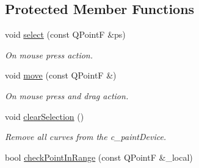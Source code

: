 \subsection*{Protected Member Functions}
\begin{DoxyCompactItemize}
\item 
\mbox{\label{classCrossPointerTool_a0b9aacf0090eee20cf1ba588db882be1}} 
void \mbox{\hyperlink{classCrossPointerTool_a0b9aacf0090eee20cf1ba588db882be1}{select}} (const Q\+PointF \&ps)
\begin{DoxyCompactList}\small\item\em On mouse press action. \end{DoxyCompactList}\item 
\mbox{\label{classCrossPointerTool_ad90be83c2f2b4a2ae276974adb1ce157}} 
void \mbox{\hyperlink{classCrossPointerTool_ad90be83c2f2b4a2ae276974adb1ce157}{move}} (const Q\+PointF \&)
\begin{DoxyCompactList}\small\item\em On mouse press and drag action. \end{DoxyCompactList}\item 
\mbox{\label{classCrossPointerTool_a736f76da2473660084ea5ecc2fd313c1}} 
void \mbox{\hyperlink{classCrossPointerTool_a736f76da2473660084ea5ecc2fd313c1}{clear\+Selection}} ()
\begin{DoxyCompactList}\small\item\em Remove all curves from the c\+\_\+paint\+Device. \end{DoxyCompactList}\item 
bool \mbox{\hyperlink{classTool_a81244366dc1b9f55465ed6f37b81033c}{check\+Point\+In\+Range}} (const Q\+PointF \&\+\_\+local)
\end{DoxyCompactItemize}

